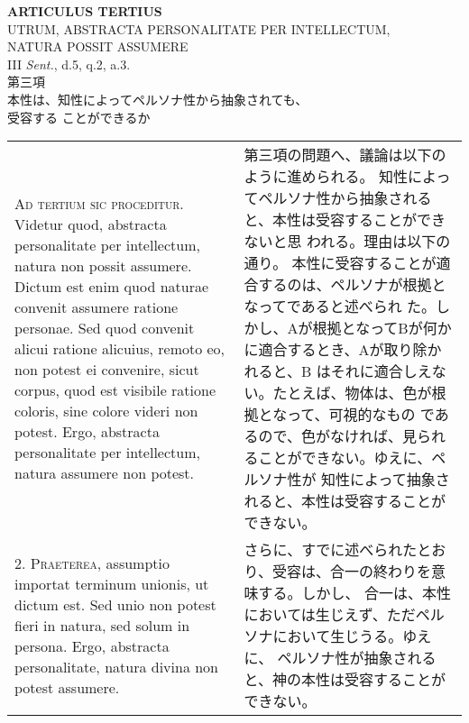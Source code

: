 \documentclass[10pt]{jsarticle} %
\begin{document}
\begin{center}
 {\Large {\bf ARTICULUS TERTIUS}}\\
 {\large UTRUM, ABSTRACTA PERSONALITATE PER INTELLECTUM,\\ NATURA POSSIT ASSUMERE}\\
 {\footnotesize III {\itshape Sent.}, d.5, q.2, a.3.}\\
 {\Large 第三項\\本性は、知性によってペルソナ性から抽象されても、\\受容する
 ことができるか}
\end{center}

\begin{longtable}{p{21em}p{21em}}




{\Huge A}{\scshape d tertium sic proceditur}. Videtur quod, abstracta personalitate per
intellectum, natura non possit assumere. Dictum est enim quod naturae
convenit assumere ratione personae. Sed quod convenit alicui ratione
alicuius, remoto eo, non potest ei convenire, sicut corpus, quod est
visibile ratione coloris, sine colore videri non potest. Ergo, abstracta
personalitate per intellectum, natura assumere non potest.


&

第三項の問題へ、議論は以下のように進められる。
知性によってペルソナ性から抽象されると、本性は受容することができないと思
 われる。理由は以下の通り。
本性に受容することが適合するのは、ペルソナが根拠となってであると述べられ
 た。しかし、Aが根拠となってBが何かに適合するとき、Aが取り除かれると、B
 はそれに適合しえない。たとえば、物体は、色が根拠となって、可視的なもの
 であるので、色がなければ、見られることができない。ゆえに、ペルソナ性が
 知性によって抽象されると、本性は受容することができない。

\\



2. {\scshape Praeterea}, assumptio importat terminum unionis, ut dictum est. Sed unio
non potest fieri in natura, sed solum in persona. Ergo, abstracta
personalitate, natura divina non potest assumere.


&


さらに、すでに述べられたとおり、受容は、合一の終わりを意味する。しかし、
 合一は、本性においては生じえず、ただペルソナにおいて生じうる。ゆえに、
 ペルソナ性が抽象されると、神の本性は受容することができない。

\\




\end{longtable}
\end{document}
